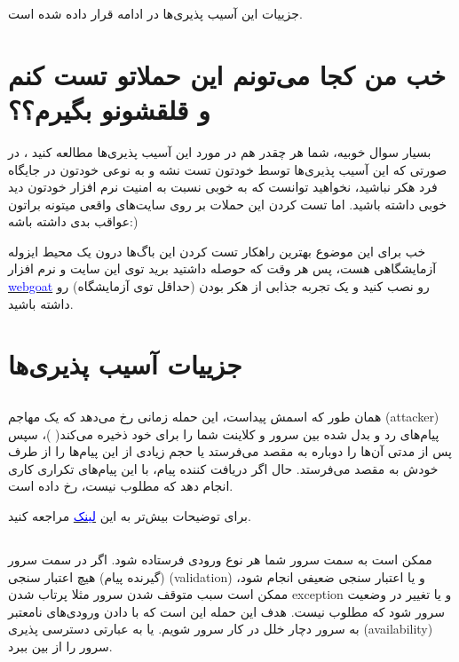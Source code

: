 \documentclass[]{article}
\begin{document}
جزییات این آسیب پذیری‌ها در ادامه قرار داده شده است.




\section*{{\titr خب من کجا می‌تونم این حملاتو تست کنم و قلقشونو بگیرم؟؟}} 

بسیار سوال خوبیه، شما هر چقدر هم در مورد این آسیب پذیری‌ها مطالعه کنید ، در صورتی که این آسیب پذیری‌ها توسط خودتون تست نشه و به نوعی خودتون در جایگاه فرد هکر نباشید، نخواهید توانست که به خوبی نسبت به امنیت نرم افزار خودتون دید خوبی داشته باشید. اما تست کردن این حملات بر روی سایت‌های واقعی میتونه براتون عواقب بدی داشته باشه:)

خب برای این موضوع بهترین راهکار تست کردن این باگ‌ها درون یک محیط ایزوله آزمایشگاهی هست، پس هر وقت که حوصله داشتید برید توی این سایت و نرم افزار \href{https://webgoat.github.io/WebGoat/}{\textcolor{blue} {webgoat}}  رو نصب کنید و یک تجربه جذابی از هکر بودن (حداقل توی آزمایشگاه) رو داشته باشید.



\section*{{\titr جزییات آسیب پذیری‌ها}}


\subsection*{{}}
همان طور که اسمش پیداست، این حمله زمانی رخ می‌دهد که یک مهاجم (‌attacker) پیام‌های رد و بدل شده بین سرور و کلاینت شما را برای خود ذخیره می‌کند(  )، سپس پس از مدتی آن‌ها را دوباره به مقصد می‌فرستد یا حجم زیادی از این پیام‌ها را از طرف خودش به مقصد می‌فرستد. حال اگر دریافت کننده پیام، با این پیام‌های تکراری کاری انجام دهد که مطلوب نیست،  رخ داده است.

برای توضیحات بیش‌تر به این \href{https://www.kaspersky.com/resource-center/definitions/replay-attack} {\textcolor{blue}{لینک}} مراجعه کنید.




\subsection*{{}}
ممکن است به سمت سرور شما هر نوع ورودی فرستاده شود. اگر در سمت سرور (گیرنده پیام) هیچ اعتبار سنجی (validation)‌ و یا اعتبار سنجی ضعیفی انجام شود،‌ ممکن است سبب متوقف شدن سرور  مثلا پرتاب شدن exception و یا تغییر در وضعیت سرور شود که مطلوب نیست. هدف این حمله این است که با دادن ورودی‌های نامعتبر به سرور دچار خلل در کار سرور شویم. یا به عبارتی دسترسی پذیری (‌availability)‌ سرور را از بین ببرد.
\bigskip
\end{document}
